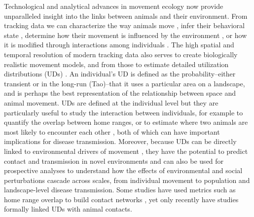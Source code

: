 \documentclass[letterpaper]{article}
\begin{document}
Technological and analytical advances in movement ecology now provide unparalleled insight into the links between animals and their environment. 
From tracking data we can characterize the way animals move \citep{Abrahms2017}, infer their behavioral state \citep{Langrock2012}, determine how their movement is influenced by the environment \citep{Avgar2015,Potts2022}, or how it is modified through interactions among individuals \citep{Scharf2016, Scharf2018}. 
The high spatial and temporal resolution of modern tracking data also serves to create biologically realistic movement models, and from those to estimate detailed utilization distributions (UDs) \citep{Fleming2014,Gurarie2011,Potts2023}.
An individual's UD is defined as the probability--either transient or in the long-run (Tao)--that it uses a particular area on a landscape, and is perhaps the best representation of the relationship between space and animal movement. 
UDs are defined at the individual level but they are particularly useful to study the interaction between individuals, for example to quantify the overlap between home ranges, or to estimate where two animals are most likely to encounter each other \citep{Noonan2021}, both of which can have important implications for disease transmission. 
Moreover, because UDs can be directly linked to environmental drivers of movement \citep{Signer2017}, they have the potential to predict contact and transmission in novel environments and can also be used for prospective analyses to understand how the effects of environmental and social perturbations cascade across scales, from individual movement to population and landscape-level disease transmission. 
Some studies have used metrics such as home range overlap to build contact networks \citep{Godfrey2010, Godfrey2013}, yet only recently have studies formally linked UDs with animal contacts.


\end{document}
